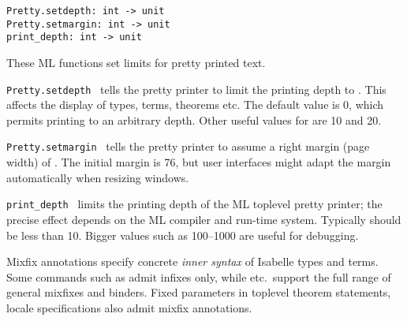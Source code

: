 \begin{isabellebody}
\begin{isamarkuptext}
\begin{description}
  \end{description}%
\end{isamarkuptext}%
\isamarkuptrue%
%
\isamarkuptrue%
%
\begin{isamarkuptext}%
\begin{mldecls}
    \verb|Pretty.setdepth: int -> unit| \\
    \verb|Pretty.setmargin: int -> unit| \\
    \verb|print_depth: int -> unit| \\
  \end{mldecls}

  These ML functions set limits for pretty printed text.

  \begin{description}

  \item \verb|Pretty.setdepth|~ tells the pretty printer to
  limit the printing depth to .  This affects the display of
  types, terms, theorems etc.  The default value is 0, which permits
  printing to an arbitrary depth.  Other useful values for 
  are 10 and 20.

  \item \verb|Pretty.setmargin|~ tells the pretty printer to
  assume a right margin (page width) of .  The initial margin
  is 76, but user interfaces might adapt the margin automatically when
  resizing windows.

  \item \verb|print_depth|~ limits the printing depth of the
  ML toplevel pretty printer; the precise effect depends on the ML
  compiler and run-time system.  Typically  should be less
  than 10.  Bigger values such as 100--1000 are useful for debugging.

  \end{description}%
\end{isamarkuptext}%
\isamarkuptrue%
%
\isamarkuptrue%
%
\begin{isamarkuptext}%
Mixfix annotations specify concrete \emph{inner syntax} of
  Isabelle types and terms.  Some commands such as \hyperlink{command.typedecl}{\mbox{}} admit infixes only, while \hyperlink{command.definition}{\mbox{}} etc.\
  support the full range of general mixfixes and binders.  Fixed
  parameters in toplevel theorem statements, locale specifications
  also admit mixfix annotations.


\end{isamarkuptext}
\end{isabellebody}
